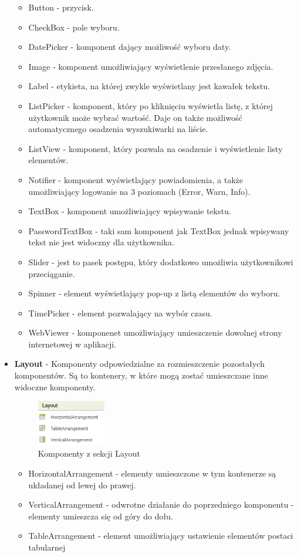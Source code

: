 \begin{itemize}
\begin{itemize}
\item Button - przycisk.
\item CheckBox - pole wyboru.
\item DatePicker - komponent dający możliwość wyboru daty.
\item Image - komponent umożliwiający wyświetlenie przesłanego zdjęcia.
\item Label - etykieta, na której zwykle wyświetlany jest kawałek tekstu.
\item ListPicker - komponent, który po kliknięciu wyświetla listę, z której użytkownik może wybrać wartość. Daje on także możliwość automatycznego osadzenia wyszukiwarki na liście.
\item ListView - komponent, który pozwala na osadzenie i wyświetlenie listy elementów.
\item Notifier - komponent wyświetlający powiadomienia, a także umożliwiający logowanie na 3 poziomach (Error, Warn, Info).
\item TextBox - komponent umożliwiający wpisywanie tekstu.
\item PasswordTextBox - taki sam komponent jak TextBox jednak wpisywany tekst nie jest widoczny dla użytkownika.
\item Slider - jest to pasek postępu, który dodatkowo umożliwia użytkownikowi przeciąganie.
\item Spinner - element wyświetlający pop-up z listą elementów do wyboru.
\item TimePicker - element pozwalający na wybór czasu.
\item WebViewer - komponenet umożliwiający umieszczenie dowolnej strony internetowej w aplikacji.
\end{itemize}

\item \textbf{Layout} - Komponenty odpowiedzialne za rozmieszczenie pozostałych komponentów. Są to kontenery, w które mogą zostać umieszczane inne widoczne komponenty.
\begin{figure}[H] 
\centering\includegraphics[height=2cm]{figures/components/layout}
\caption{Komponenty z sekcji Layout}
\end{figure}

\begin{itemize}
\item HorizontalArrangement - elementy umieszczone w tym kontenerze są układanej od lewej do prawej.
\item VerticalArrangement - odwrotne działanie do poprzedniego komponentu - elementy umieszcza się od góry do dołu.
\item TableArrangement - element umożliwiający ustawienie elementów postaci tabularnej
\end{itemize}



\end{itemize}
